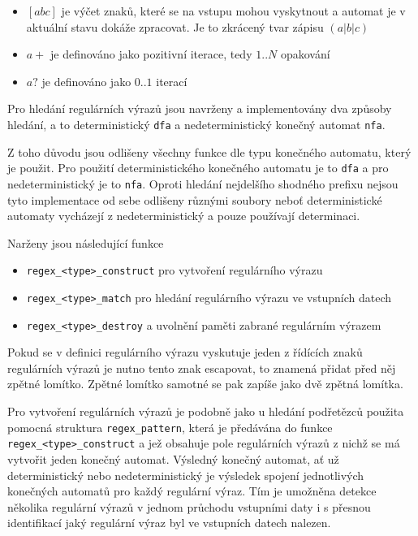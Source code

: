 \begin{itemize}
    \item{$[abc]$ je výčet znaků, které se na vstupu mohou vyskytnout a automat je v aktuální stavu dokáže zpracovat. Je to zkrácený tvar zápisu $(a|b|c)$}
    \item{$a+$ je definováno jako pozitivní iterace, tedy $1..N$ opakování}
    \item{$a?$ je definováno jako $0..1$ iterací}
\end{itemize}


Pro hledání regulárních výrazů jsou navrženy a implementovány dva způsoby hledání, a to
deterministický \texttt{dfa} a nedeterministický konečný automat \texttt{nfa}.

Z toho důvodu jsou odlišeny všechny funkce dle typu konečného automatu, který je použit.
Pro použití deterministického konečného automatu je to \texttt{dfa} a pro nedeterministický
je to \texttt{nfa}.
Oproti hledání nejdelšího shodného prefixu nejsou tyto implementace od sebe odlišeny
různými soubory neboť deterministické automaty vycházejí z nedeterministický a pouze používají
determinaci.

Narženy jsou následující funkce

\begin{itemize}
    \item{\texttt{regex\_<type>\_construct} pro vytvoření regulárního výrazu}
    \item{\texttt{regex\_<type>\_match} pro hledání regulárního výrazu ve vstupních datech}
    \item{\texttt{regex\_<type>\_destroy} a uvolnění paměti zabrané regulárním výrazem}
\end{itemize}

Pokud se v definici regulárního výrazu vyskutuje jeden z řídících znaků regulárních výrazů
je nutno tento znak escapovat, to znamená přidat před něj zpětné lomítko.
Zpětné lomítko samotné se pak zapíše jako dvě zpětná lomítka.

Pro vytvoření regulárních výrazů je podobně jako u hledání podřetězců
použita pomocná struktura \texttt{regex\_pattern}, která je předávána do funkce \texttt{regex\_<type>\_construct}
a jež obsahuje pole regulárních výrazů z nichž se má vytvořit jeden konečný automat.
Výsledný konečný automat, ať už deterministický nebo nedeterministický je výsledek spojení jednotlivých
konečných automatů pro každý regulární výraz. Tím je umožněna detekce několika
regulární výrazů v jednom průchodu vstupními daty i s přesnou identifikací jaký regulární
výraz byl ve vstupních datech nalezen.

